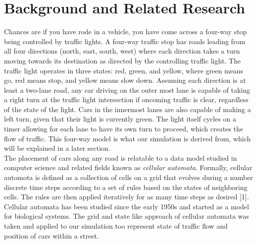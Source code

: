 \documentclass[conference]{IEEEtran}
\begin{document}
\section{Background and Related Research}
Chances are if you have rode in a vehicle, you have come across a four-way stop being controlled by traffic lights. A four-way traffic stop has roads leading from all four directions (north, east, south, west) where each direction takes a turn moving towards its destination as directed by the controlling traffic light. The traffic light operates in three states: red, green, and yellow, where green means go, red means stop, and yellow means slow down. Assuming each direction is at least a two-lane road, any car driving on the outer most lane is capable of taking a right turn at the traffic light intersection if oncoming traffic is clear, regardless of the state of the light. Cars in the innermost lanes are also capable of making a left turn, given that their light is currently green. The light itself cycles on a timer allowing for each lane to have its own turn to proceed, which creates the flow of traffic. This four-way model is what our simulation is derived from, which will be explained in a later section. \\
\hspace*{.2cm} The placement of cars along any road is relatable to a data model studied in computer science and related fields known as \textit{cellular automata}. Formally, cellular automota is defined as a collection of cells on a grid that evolves during a number discrete time steps according to a set of rules based on the states of neighboring cells. The rules are then applied iteratively for as many time steps as desired [1]. Cellular automata has been studied since the early 1950s and started as a model for biological systems. The grid and state like approach of cellular automata was taken and applied to our simulation too represent state of traffic flow and position of cars within a street.
\end{document}
